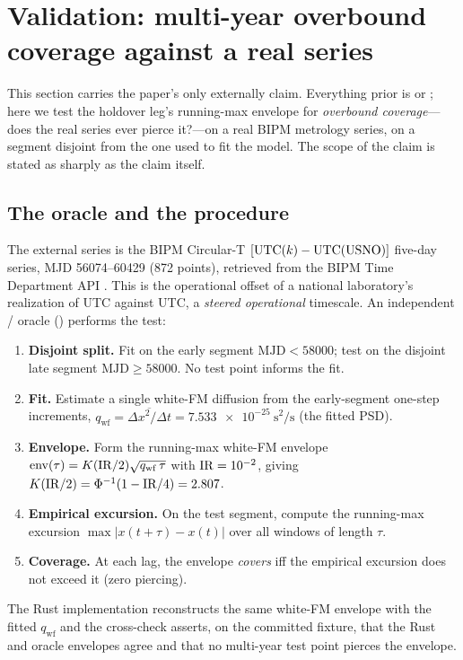 \section{Validation: multi-year overbound coverage against a real series}
\label{sec:validation}

This section carries the paper's only externally \Validated{} claim. Everything
prior is \Cited{} or \Proven{}; here we test the holdover leg's running-max
envelope for \emph{overbound coverage}---does the real series ever pierce it?---on
a real BIPM metrology series, on a segment disjoint from the one used to fit the
model. The scope of the claim is stated as sharply as the claim itself.

\subsection{The oracle and the procedure}
\label{sec:oracle}

The external series is the BIPM Circular-T $[\mathrm{UTC}(k){}-\mathrm{UTC(USNO)}]$ five-day
series, MJD 56074--60429 (872 points), retrieved from the BIPM Time Department
 API \citep{bipmcirculart}. This is the operational offset of a
national laboratory's realization of UTC against UTC, a \emph{steered operational}
timescale. An independent / oracle
() performs the test:
\begin{enumerate}
  \item \textbf{Disjoint split.} Fit on the early segment $\mathrm{MJD}<58000$;
  test on the disjoint late segment $\mathrm{MJD}\ge58000$. No test point informs
  the fit.
  \item \textbf{Fit.} Estimate a single white-FM diffusion from the early-segment
  one-step increments, $q_{\mathrm{wf}}=\overline{\Delta x^{2}/\Delta t}=
  \SI{7.533e-25}{\square\second\per\second}$ (the fitted PSD).
  \item \textbf{Envelope.} Form the running-max white-FM envelope
  $\mathrm{env}(\tau)=K(\mathrm{IR}/2)\sqrt{q_{\mathrm{wf}}\,\tau}$ with
  $\mathrm{IR}=\num{e-2}$, giving $K(\mathrm{IR}/2)=\Phi^{-1}(1-\mathrm{IR}/4)=2.807$.
  \item \textbf{Empirical excursion.} On the test segment, compute the running-max
  excursion $\max|x(t+\tau)-x(t)|$ over all windows of length $\tau$.
  \item \textbf{Coverage.} At each lag, the envelope \emph{covers} iff the
  empirical excursion does not exceed it (zero piercing).
\end{enumerate}
The Rust implementation reconstructs the same white-FM envelope with the fitted
$q_{\mathrm{wf}}$ and the cross-check
 asserts, on the
committed fixture, that the Rust and oracle envelopes agree and that no
multi-year test point pierces the envelope.

